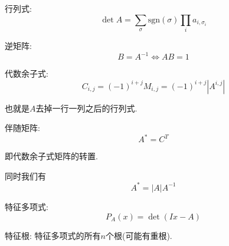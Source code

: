 行列式: $$\det A = \sum_{\sigma} \text{sgn}(\sigma) \prod_{i}a_{i, \sigma_i}$$

逆矩阵: $$B = A^{-1} \iff AB = 1$$

代数余子式: $$C_{i, j} = (-1)^{i + j} M_{i, j} = (-1) ^ {i + j} \left| A ^ {i, j} \right|$$

也就是$A$去掉一行一列之后的行列式.

伴随矩阵: $$A^{*} = C^T$$

即代数余子式矩阵的转置.

同时我们有 $$ A^{*} = |A| A^{-1}$$

特征多项式: $$P_A(x) = \det{(Ix - A)}$$

特征根: 特征多项式的所有$n$个根(可能有重根).